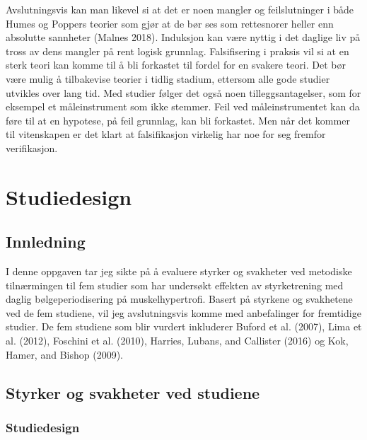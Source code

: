 \documentclass[
  letterpaper,
  DIV=11,
  numbers=noendperiod]{scrreprt}
\begin{document}
Avslutningsvis kan man likevel si at det er noen mangler og
feilslutninger i både Humes og Poppers teorier som gjør at de bør ses
som rettesnorer heller enn absolutte sannheter (Malnes 2018). Induksjon
kan være nyttig i det daglige liv på tross av dens mangler på rent
logisk grunnlag. Falsifisering i praksis vil si at en sterk teori kan
komme til å bli forkastet til fordel for en svakere teori. Det bør være
mulig å tilbakevise teorier i tidlig stadium, ettersom alle gode studier
utvikles over lang tid. Med studier følger det også noen
tilleggsantagelser, som for eksempel et måleinstrument som ikke stemmer.
Feil ved måleinstrumentet kan da føre til at en hypotese, på feil
grunnlag, kan bli forkastet. Men når det kommer til vitenskapen er det
klart at falsifikasjon virkelig har noe for seg fremfor verifikasjon.


\hypertarget{studiedesign}{%
\chapter{Studiedesign}\label{studiedesign}}

\hypertarget{innledning}{%
\section{Innledning}\label{innledning}}

I denne oppgaven tar jeg sikte på å evaluere styrker og svakheter ved
metodiske tilnærmingen til fem studier som har undersøkt effekten av
styrketrening med daglig bølgeperiodisering på muskelhypertrofi. Basert
på styrkene og svakhetene ved de fem studiene, vil jeg avslutningsvis
komme med anbefalinger for fremtidige studier. De fem studiene som blir
vurdert inkluderer Buford et al. (2007), Lima et al. (2012), Foschini et
al. (2010), Harries, Lubans, and Callister (2016) og Kok, Hamer, and
Bishop (2009).

\hypertarget{styrker-og-svakheter-ved-studiene}{%
\section{Styrker og svakheter ved
studiene}\label{styrker-og-svakheter-ved-studiene}}

\hypertarget{studiedesign-1}{%
\subsection{Studiedesign}\label{studiedesign-1}}
\end{document}
